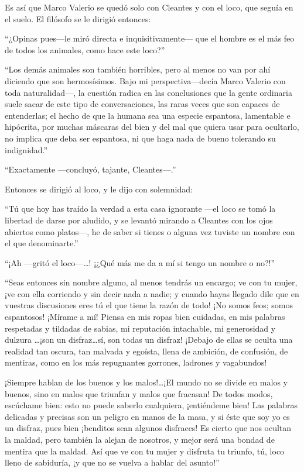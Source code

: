 \documentclass[11pt,openany]{book}
\begin{document}
Es así que Marco Valerio se quedó solo con Cleantes y con el loco, que seguía en el suelo. El filósofo se le dirigió entonces: 

“¿Opinas pues—le miró directa e inquisitivamente— que el hombre es el más feo de todos los animales, como hace este loco?” 

“Los demás animales son también horribles, pero al menos no van por ahí diciendo que son hermosísimos. Bajo mi perspectiva—decía Marco Valerio con toda naturalidad—, la cuestión radica en las conclusiones que la gente ordinaria suele sacar de este tipo de conversaciones, las raras veces que son capaces de entenderlas; el hecho de que la humana sea una especie espantosa, lamentable e hipócrita, por muchas máscaras del bien y del mal que quiera usar para ocultarlo, no implica que deba ser espantosa, ni que haga nada de bueno tolerando su indignidad.” 

“Exactamente —concluyó, tajante, Cleantes—.” 

Entonces se dirigió al loco, y le dijo con solemnidad: 

“Tú que hoy has traído la verdad a esta casa ignorante —el loco se tomó la libertad de darse por aludido, y se levantó mirando a Cleantes con los ojos abiertos como platos—, he de saber si tienes o alguna vez tuviste un nombre con el que denominarte.” 

“¡Ah —gritó el loco—\dots! ¡¿Qué más me da a mí si tengo un nombre o no?!” 

“Seas entonces sin nombre alguno, al menos tendrás un encargo; ve con tu mujer, ¡ve con ella corriendo y sin decir nada a nadie; y cuando hayas llegado dile que en vuestras discusiones eres tú el que tiene la razón de todo! ¡No somos feos; somos espantosos! ¡Mírame a mí! Piensa en mis ropas bien cuidadas, en mis palabras respetadas y tildadas de sabias, mi reputación intachable, mi generosidad y dulzura \dots ¡son un disfraz\dots sí, son todas un disfraz! ¡Debajo de ellas se oculta una realidad tan oscura, tan malvada y egoísta, llena de ambición, de confusión, de mentiras, como en los más repugnantes gorrones, ladrones y vagabundos!  

¡Siempre hablan de los buenos y los malos!\dots ¡El mundo no se divide en malos y buenos, sino en malos que triunfan y malos que fracasan! De todos modos, escúchame bien: esto no puede saberlo cualquiera, ¡entiéndeme bien! Las palabras delicadas y precisas son un peligro en manos de la masa, y si éste que soy yo es un disfraz, pues bien ¡benditos sean algunos disfraces! Es cierto que nos ocultan la maldad, pero también la alejan de nosotros, y mejor será una bondad de mentira que la maldad. Así que ve con tu mujer y disfruta tu triunfo, tú, loco lleno de sabiduría, ¡y que no se vuelva a hablar del asunto!” 
\end{document}
